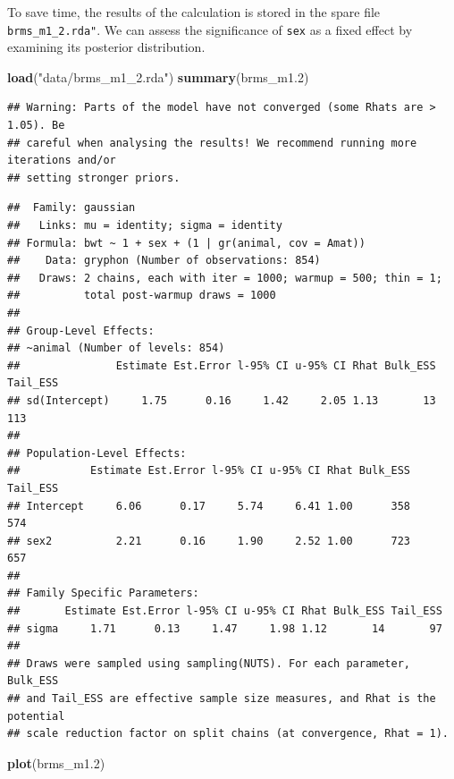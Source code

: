 \documentclass[
  12pt,
]{book}
\newenvironment{Shaded}{\begin{snugshade}}{\end{snugshade}}
\newcommand{\FloatTok}[1]{\textcolor[rgb]{0.00,0.00,0.81}{#1}}
\newcommand{\KeywordTok}[1]{\textcolor[rgb]{0.13,0.29,0.53}{\textbf{#1}}}
\newcommand{\NormalTok}[1]{#1}
\newcommand{\StringTok}[1]{\textcolor[rgb]{0.31,0.60,0.02}{#1}}
\begin{document}
To save time, the results of the calculation is stored in the spare file \texttt{brms\_m1\_2.rda"}.
We can assess the significance of \texttt{sex} as a fixed effect by examining its posterior distribution.

\begin{Shaded}
\begin{Highlighting}[]
\KeywordTok{load}\NormalTok{(}\StringTok{"data/brms\_m1\_2.rda"}\NormalTok{)}
\KeywordTok{summary}\NormalTok{(brms\_m1}\FloatTok{.2}\NormalTok{)}
\end{Highlighting}
\end{Shaded}

\begin{verbatim}
## Warning: Parts of the model have not converged (some Rhats are > 1.05). Be
## careful when analysing the results! We recommend running more iterations and/or
## setting stronger priors.
\end{verbatim}

\begin{verbatim}
##  Family: gaussian 
##   Links: mu = identity; sigma = identity 
## Formula: bwt ~ 1 + sex + (1 | gr(animal, cov = Amat)) 
##    Data: gryphon (Number of observations: 854) 
##   Draws: 2 chains, each with iter = 1000; warmup = 500; thin = 1;
##          total post-warmup draws = 1000
## 
## Group-Level Effects: 
## ~animal (Number of levels: 854) 
##               Estimate Est.Error l-95% CI u-95% CI Rhat Bulk_ESS Tail_ESS
## sd(Intercept)     1.75      0.16     1.42     2.05 1.13       13      113
## 
## Population-Level Effects: 
##           Estimate Est.Error l-95% CI u-95% CI Rhat Bulk_ESS Tail_ESS
## Intercept     6.06      0.17     5.74     6.41 1.00      358      574
## sex2          2.21      0.16     1.90     2.52 1.00      723      657
## 
## Family Specific Parameters: 
##       Estimate Est.Error l-95% CI u-95% CI Rhat Bulk_ESS Tail_ESS
## sigma     1.71      0.13     1.47     1.98 1.12       14       97
## 
## Draws were sampled using sampling(NUTS). For each parameter, Bulk_ESS
## and Tail_ESS are effective sample size measures, and Rhat is the potential
## scale reduction factor on split chains (at convergence, Rhat = 1).
\end{verbatim}

\begin{Shaded}
\begin{Highlighting}[]
\KeywordTok{plot}\NormalTok{(brms\_m1}\FloatTok{.2}\NormalTok{)}
\end{Highlighting}
\end{Shaded}
\end{document}
